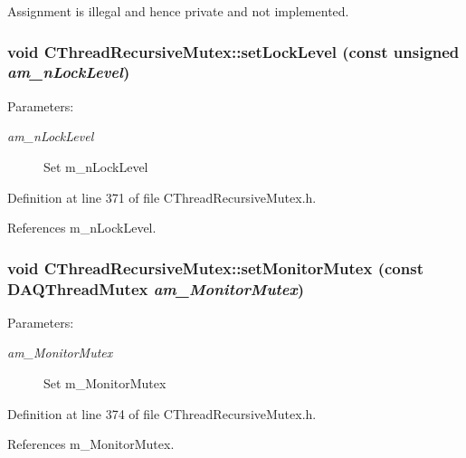 Assignment is illegal and hence private and not implemented. 
\subsubsection{\setlength{\rightskip}{0pt plus 5cm}void CThread\-Recursive\-Mutex::set\-Lock\-Level (const unsigned {\em am\_\-n\-Lock\-Level})\hspace{0.3cm}{\tt  [inline, protected]}}\label{classCThreadRecursiveMutex_b2}


\begin{Desc}
\item[Parameters: ]\par
\begin{description}
\item[{\em 
am\_\-n\-Lock\-Level}]Set m\_\-n\-Lock\-Level \end{description}
\end{Desc}


Definition at line 371 of file CThread\-Recursive\-Mutex.h.

References m\_\-n\-Lock\-Level.
\subsubsection{\setlength{\rightskip}{0pt plus 5cm}void CThread\-Recursive\-Mutex::set\-Monitor\-Mutex (const DAQThread\-Mutex {\em am\_\-Monitor\-Mutex})\hspace{0.3cm}{\tt  [inline, protected]}}\label{classCThreadRecursiveMutex_b3}


\begin{Desc}
\item[Parameters: ]\par
\begin{description}
\item[{\em 
am\_\-Monitor\-Mutex}]Set m\_\-Monitor\-Mutex \end{description}
\end{Desc}


Definition at line 374 of file CThread\-Recursive\-Mutex.h.

References m\_\-Monitor\-Mutex.
